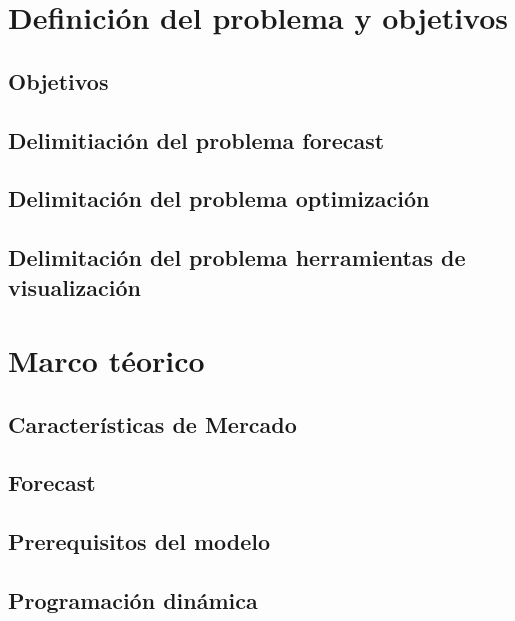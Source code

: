 \documentclass[12pt]{article}
\begin{document}
\section{Definición del problema y objetivos} \label{sec:Definición}

\subsection{Objetivos} \label{subsec: Objetivo}

\subsection{Delimitiación del problema forecast} \label{subsec: Delimitación}

\subsection{Delimitación del problema optimización} \label{subsec: Herramientas}

\subsection{Delimitación del problema herramientas de visualización} \label{subsec: Herramientas}



\section{Marco téorico}\label{sec: MT}

\subsection{Características de Mercado} \label{sec:caracmerc}


\subsection{Forecast} \label{sec:forecasting}


\subsection{Prerequisitos del modelo} \label{sec:forecasting}


\subsection{Programación dinámica} \label{sec:programación dinámica}

\end{document}
